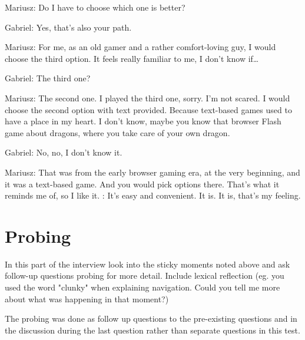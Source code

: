\begin{QandA}
         \begin{answered}
            Mariusz: Do I have to choose which one is better?

            Gabriel: Yes, that’s also your path.

            Mariusz: For me, as an old gamer and a rather comfort-loving guy, I would choose the third option.
            It feels really familiar to me, I don’t know if…

            Gabriel: The third one?

            Mariusz: The second one.
            I played the third one, sorry.
            I’m not scared.
            I would choose the second option with text provided.
            Because text-based games used to have a place in my heart.
            I don’t know, maybe you know that browser Flash game about dragons, where you take care of your own dragon.

            Gabriel: No, no, I don’t know it.

            Mariusz: That was from the early browser gaming era, at the very beginning, and it was a text-based game.
            And you would pick options there.
            That’s what it reminds me of, so I like it.
            : It’s easy and convenient.
            It is.
            It is, that’s my feeling.
            
         \end{answered}
\end{QandA}






\section{Probing}
In this part of the interview look into the sticky moments noted above and ask follow-up questions probing for more detail.
Include lexical reflection (eg. you used the word "clunky" when explaining navigation. Could you tell me more about what was happening
in that moment?)

The probing was done as follow up questions to the pre-existing questions and in the discussion during the last question rather than separate questions in this test.



